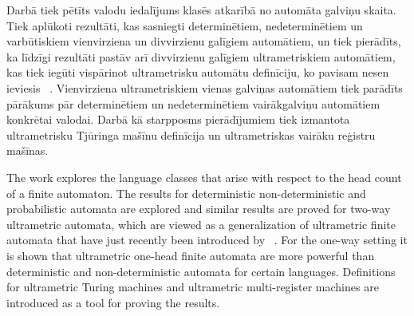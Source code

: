 \documentclass{ludis}
\begin{document}
\maketitle

\begin{abstract-lv}
Darbā tiek pētīts valodu iedalījums klasēs atkarībā no automāta galviņu skaita. Tiek aplūkoti rezultāti, kas sasniegti determinētiem, nedeterminētiem un varbūtiskiem vienvirziena un divvirzienu galīgiem automātiem, un tiek pierādīts, ka līdzīgi rezultāti pastāv arī divvirzienu galīgiem ultrametriskiem automātiem, kas tiek iegūti vispārinot ultrametrisku automātu definīciju, ko pavisam nesen ieviesis ~\citet{Freivalds2012}. Vienvirziena ultrametriskiem vienas galviņas automātiem tiek parādīts pārākums pār determinētiem un nedeterminētiem vairākgalviņu automātiem konkrētai valodai. Darbā kā starpposms pierādījumiem tiek izmantota ultrametrisku Tjūringa mašīnu definīcija un ultrametriskas vairāku reģistru mašīnas.
\end{abstract-lv}
\clearpage

\begin{abstract-en}
The work explores the language classes that arise with respect to the head count of a finite automaton. The results for deterministic non-deterministic and probabilistic automata are explored and similar results are proved for two-way ultrametric automata, which are viewed as a generalization of ultrametric finite automata that have just recently been introduced by ~\citet{Freivalds2012}. For the one-way setting it is shown that ultrametric one-head finite automata are more powerful than deterministic and non-deterministic automata for certain languages. Definitions for ultrametric Turing machines and ultrametric multi-register machines are introduced as a tool for proving the results.
\end{abstract-en}


\tableofcontents
\end{document}
